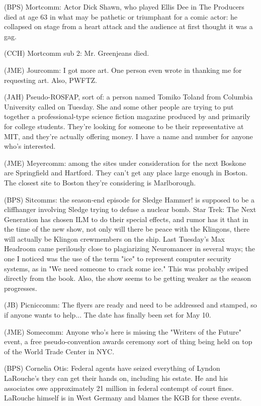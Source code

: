 \documentclass[12pt]{article}
\begin{document}
(BPS) Mortcomm: Actor Dick Shawn, who played Ellis Dee in The Producers died at age 63 in what may be pathetic or triumphant for a comic actor: he collapsed on stage from a heart attack and the audience at first thought it was a gag.

(CCH) Mortcomm sub 2: Mr. Greenjeans died.

(JME) Jourcomm: I got more art. One person even wrote in thanking me for requesting art. Also, PWFTZ.

(JAH) Pseudo-ROSFAP, sort of: a person named Tomiko Toland from Columbia University called on Tuesday. She and some other people are trying to put together a professional-type science fiction magazine produced by and primarily for college students. They're looking for someone to be their representative at MIT, and they're actually offering money. I have a name and number for anyone who's interested.

(JME) Meyercomm: among the sites under consideration for the next Boskone are Springfield and Hartford. They can't get any place large enough in Boston. The closest site to Boston they're considering is Marlborough.

(BPS) Sitcomms: the season-end episode for Sledge Hammer! is supposed to be a cliffhanger involving Sledge trying to defuse a nuclear bomb. Star Trek: The Next Generation has chosen ILM to do their special effects, and rumor has it that in the time of the new show, not only will there be peace with the Klingons, there will actually be Klingon crewmembers on the ship. Last Tuesday's Max Headroom came perilously close to plagiarizing Neuromancer in several ways; the one I noticed was the use of the term "ice" to represent computer security systems, as in "We need someone to crack some ice." This was probably swiped directly from the book. Also, the show seems to be getting weaker as the season progresses.

(JB) Picniccomm: The flyers are ready and need to be addressed and stamped, so if anyone wants to help... The date has finally been set for May 10.

(JME) Somecomm: Anyone who's here is missing the "Writers of the Future" event, a free pseudo-convention awards ceremony sort of thing being held on top of the World Trade Center in NYC.

(BPS) Cornelia Otis: Federal agents have seized everything of Lyndon LaRouche's they can get their hands on, including his estate. He and his associates owe approximately 21 million in federal contempt of court fines. LaRouche himself is in West Germany and blames the KGB for these events.
\end{document}
